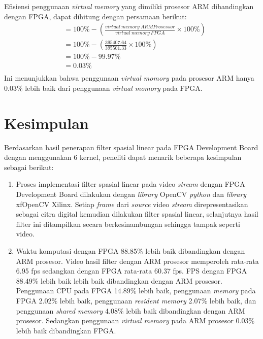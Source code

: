 Efisiensi penggunaan \textit{virtual} \textit{memory} yang dimiliki prosesor ARM dibandingkan dengan FPGA, dapat dihitung dengan persamaan berikut:
\begin{equation*}
    \begin{split}
& = 100\% - \left( \frac{virtual\ memory\ ARM Prosessor}{virtual\ memory\ FPGA} \times 100\% \right) \\
& = 100\% - \left( \frac{395407.64}{395501.33} \times 100\% \right) \\
& = 100\% - 99.97\% \\
& = 0.03\% \\
    \end{split}
\end{equation*}
Ini menunjukkan bahwa penggunaan \textit{virtual momory} pada prosesor ARM hanya 0.03\% lebih baik dari penggunaan \textit{virtual momory} pada FPGA.


\section{Kesimpulan}

Berdasarkan hasil penerapan filter spasial linear pada FPGA Development Board dengan menggunakan 6 kernel, peneliti dapat menarik beberapa kesimpulan sebagai berikut:
\begin{enumerate}[topsep=0pt,itemsep=0pt,partopsep=0pt, parsep=0pt]
    \item Proses implementasi filter spasial linear pada video \textit{stream} dengan FPGA Development Board dilakukan dengan \textit{library} OpenCV \textit{python} dan \textit{library} xfOpenCV Xilinx. Setiap \textit{frame} dari \textit{source} video \textit{stream} direpresentasikan sebagai citra digital kemudian dilakukan filter spasial linear, selanjutnya hasil filter ini ditampilkan secara berkesinambungan sehingga tampak seperti video.
    \item Waktu komputasi dengan FPGA 88.85\% lebih baik dibandingkan dengan ARM prosesor. Video hasil filter dengan ARM prosesor memperoleh rata-rata 6.95 fps sedangkan dengan FPGA rata-rata 60.37 fps. FPS dengan FPGA 88.49\% lebih baik lebih baik dibandingkan dengan ARM prosesor. Penggunaan CPU pada FPGA 14.89\% lebih baik, penggunaan \textit{memory} pada FPGA 2.02\% lebih baik, penggunaan \textit{resident memory} 2.07\% lebih baik, dan penggunaan \textit{shared memory} 4.08\% lebih baik dibandingkan dengan ARM prosesor. Sedangkan penggunaan \textit{virtual memory} pada ARM prosesor 0.03\% lebih baik dibandingkan FPGA.
\end{enumerate}